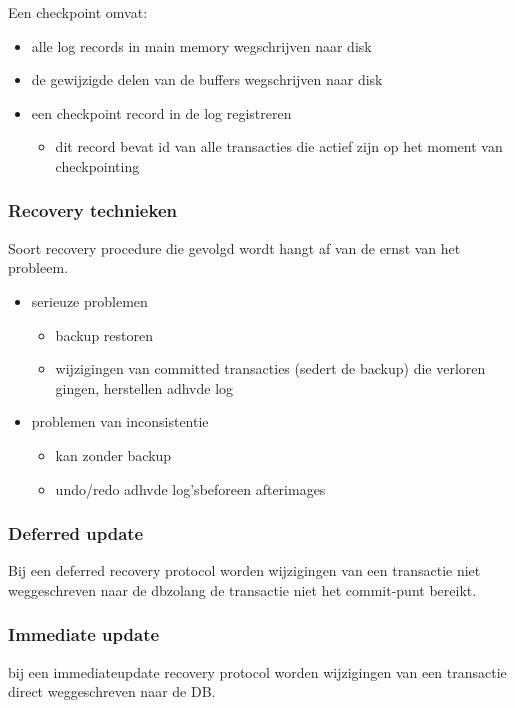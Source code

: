 \documentclass[a4paper,12pt]{article}
\begin{document}
Een checkpoint omvat:
\begin{itemize}
\item alle log records in main memory wegschrijven naar disk
\item de gewijzigde delen van de buffers wegschrijven naar disk
\item een checkpoint record in de log registreren
	\begin{itemize}
	\item dit record bevat id van alle transacties die actief zijn op het moment van checkpointing
	\end{itemize}
\end{itemize}

\subsubsection{Recovery technieken}
Soort recovery procedure die gevolgd wordt hangt af van de ernst van het probleem.
\begin{itemize}
\item serieuze problemen
	\begin{itemize}
	\item backup restoren
	\item wijzigingen van committed transacties (sedert de backup) die verloren gingen, herstellen adhvde log
	\end{itemize}
\item problemen van inconsistentie
	\begin{itemize}
	\item kan zonder backup
	\item undo/redo adhvde log'sbeforeen afterimages
	\end{itemize}
\end{itemize}


\subsubsection{Deferred update}
Bij een deferred recovery protocol worden wijzigingen van een transactie niet weggeschreven naar de dbzolang de transactie niet het commit-punt bereikt.

\subsubsection{Immediate update}
bij een immediateupdate recovery protocol worden wijzigingen van een transactie direct weggeschreven naar de DB.
\end{document}
